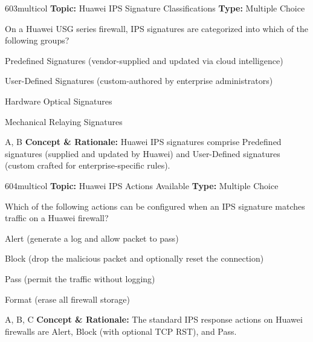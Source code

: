 \begin{qcard}{603}{multicol}
\textcolor{darkslate!75}{\small\textbf{Topic:} Huawei IPS Signature Classifications \hfill \textbf{Type:} Multiple Choice}\vspace{0.4em}\par
On a Huawei USG series firewall, IPS signatures are categorized into which of the following groups?
\begin{qoptions}
\item Predefined Signatures (vendor-supplied and updated via cloud intelligence)
\item User-Defined Signatures (custom-authored by enterprise administrators)
\item Hardware Optical Signatures
\item Mechanical Relaying Signatures
\end{qoptions}
\end{qcard}
\nopagebreak
\begin{explainbox}{A, B}
\textbf{Concept \& Rationale:} Huawei IPS signatures comprise Predefined signatures (supplied and updated by Huawei) and User-Defined signatures (custom crafted for enterprise-specific rules).
\end{explainbox}

\begin{qcard}{604}{multicol}
\textcolor{darkslate!75}{\small\textbf{Topic:} Huawei IPS Actions Available \hfill \textbf{Type:} Multiple Choice}\vspace{0.4em}\par
Which of the following actions can be configured when an IPS signature matches traffic on a Huawei firewall?
\begin{qoptions}
\item Alert (generate a log and allow packet to pass)
\item Block (drop the malicious packet and optionally reset the connection)
\item Pass (permit the traffic without logging)
\item Format (erase all firewall storage)
\end{qoptions}
\end{qcard}
\nopagebreak
\begin{explainbox}{A, B, C}
\textbf{Concept \& Rationale:} The standard IPS response actions on Huawei firewalls are Alert, Block (with optional TCP RST), and Pass.
\end{explainbox}

